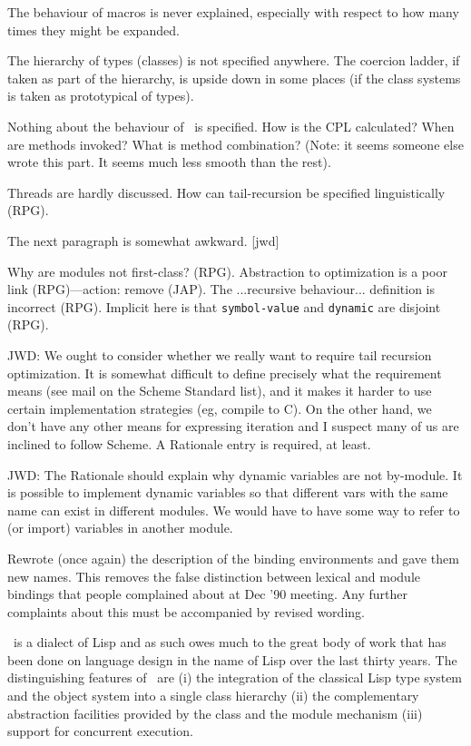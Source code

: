 \begin{introduction}
\label{sec:intro}
\begin{optPrivate}
The behaviour of macros is never explained, especially with respect to how many
times they might be expanded.

The hierarchy of types (classes) is not specified anywhere.  The coercion
ladder, if taken as part of the hierarchy, is upside down in some places (if the
class systems is taken as prototypical of types).

Nothing about the behaviour of \telos\ is specified.  How is the CPL calculated?
When are methods invoked?  What is method combination?  (Note: it seems someone
else wrote this part.  It seems much less smooth than the rest).

Threads are hardly discussed.  How can tail-recursion be specified
linguistically (RPG).

The next paragraph is somewhat awkward.  [jwd]

Why are modules not first-class? (RPG).  Abstraction to optimization is a poor
link (RPG)---action: remove (JAP).  The ...recursive behaviour... definition is
incorrect (RPG).  Implicit here is that {\tt symbol-value} and {\tt dynamic} are
disjoint (RPG).

JWD: We ought to consider whether we really want to require tail recursion
optimization.  It is somewhat difficult to define precisely what the requirement
means (see mail on the Scheme Standard list), and it makes it harder to use
certain implementation strategies (eg, compile to C).  On the other hand, we
don't have any other means for expressing iteration and I suspect many of us are
inclined to follow Scheme.  A Rationale entry is required, at least.

JWD: The Rationale should explain why dynamic variables are not by-module.  It
is possible to implement dynamic variables so that different vars with the same
name can exist in different modules.  We would have to have some way to refer to
(or import) variables in another module.

Rewrote (once again) the description of the binding environments and gave them
new names.  This removes the false distinction between lexical and module
bindings that people complained about at Dec '90 meeting.  Any further
complaints about this must be accompanied by revised wording.
\end{optPrivate}

\begin{optDefinition}
\eulisp\ is a dialect of Lisp and as such owes much to the great body of work
that has been done on language design in the name of Lisp over the last thirty
years.  The distinguishing features of \eulisp\ are (i) the integration of the
classical Lisp type system and the object system into a single class hierarchy
(ii) the complementary abstraction facilities provided by the class and the
module mechanism (iii) support for concurrent execution.


\end{optDefinition}
\end{introduction}
